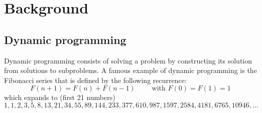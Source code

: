 

\newpage
\section{Background} \label{background}
\subsection{Dynamic programming} \label{bg_dp}
Dynamic programming consists of solving a problem by constructing its solution from solutions to subproblems. A famous example of dynamic programming is the Fibonacci series that is defined by the following recurrence:
\[F(n+1) = F(n)+F(n-1) \qquad \text{ with } F(0)=F(1)=1 \]
which expands to (first 21 numbers)
\[1, 1, 2, 3, 5, 8, 13, 21, 34, 55, 89, 144, 233, 377, 610, 987, 1597, 2584, 4181, 6765, 10946, ...\]

